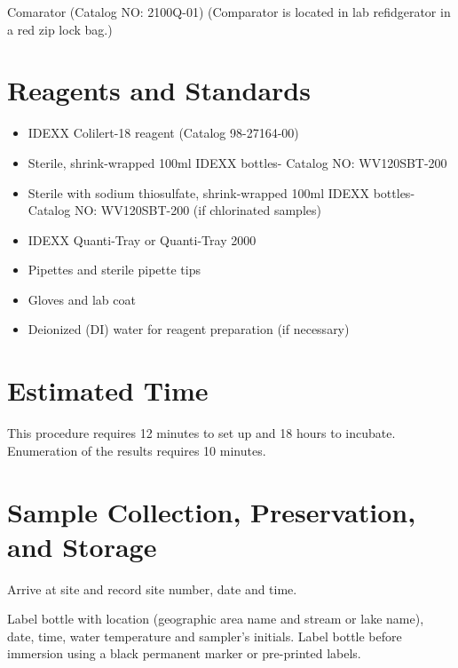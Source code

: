 \documentclass[12pt]{../SOP4_alpha}\usepackage[]{graphicx}\usepackage[]{xcolor}
\begin{document}
\NP Comarator (Catalog NO: 2100Q-01) (Comparator is located in lab refidgerator in a red zip lock bag.)

\section{Reagents and Standards}

\begin{itemize}

\item IDEXX Colilert-18 reagent (Catalog 98-27164-00)

\item Sterile, shrink-wrapped 100ml IDEXX bottles- Catalog NO: WV120SBT-200 

\item Sterile with sodium thiosulfate, shrink-wrapped 100ml IDEXX bottles- Catalog NO: WV120SBT-200 (if chlorinated samples)

\item IDEXX Quanti-Tray or Quanti-Tray 2000
\item Pipettes and sterile pipette tips

\item Gloves and lab coat

\item Deionized (DI) water for reagent preparation (if necessary)

\end{itemize}

\section{Estimated Time}

\NP This procedure requires 12 minutes to set up and 18 hours to incubate. Enumeration of the results requires 10 minutes.

\section{Sample Collection, Preservation, and Storage}

\NP  Arrive at site and record site number, date and time.


\NP Label bottle with location (geographic area name and stream or lake name),
date, time, water temperature and sampler's initials. Label bottle before
immersion using a black permanent marker or pre-printed labels. 
\end{document}
